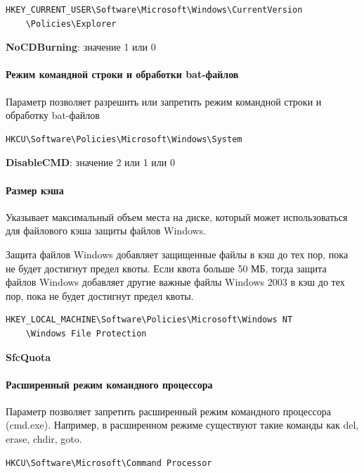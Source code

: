 \documentclass[russian,utf8,emptystyle]{eskdtext}
\begin{document}
\begin{verbatim}
HKEY_CURRENT_USER\Software\Microsoft\Windows\CurrentVersion
	\Policies\Explorer
\end{verbatim}

\textbf{NoCDBurning}: значение 1 или 0


\paragraph{Режим командной строки и обработки bat-файлов}

Параметр позволяет разрешить или запретить режим командной строки и обработку bat-файлов

\begin{verbatim}
HKCU\Software\Policies\Microsoft\Windows\System
\end{verbatim}

\textbf{DisableCMD}: значение 2 или 1 или 0 


\paragraph{Размер кэша}

Указывает максимальный объем места на диске, который может использоваться для файлового кэша защиты файлов Windows.

Защита файлов Windows добавляет защищенные файлы в кэш до тех пор, пока не будет достигнут предел квоты. Если квота больше 50 МБ, тогда защита файлов Windows добавляет другие важные файлы Windows 2003 в кэш до тех пор, пока не будет достигнут предел квоты. 

\begin{verbatim}
HKEY_LOCAL_MACHINE\Software\Policies\Microsoft\Windows NT
	\Windows File Protection
\end{verbatim}

\textbf{SfcQuota}


\paragraph{Расширенный режим командного процессора}

Параметр позволяет запретить расширенный режим командного процессора (cmd.exe). Например, в расширенном режиме существуют такие команды как del, erase, chdir, goto.

\begin{verbatim}
HKCU\Software\Microsoft\Command Processor
\end{verbatim}
\end{document}

